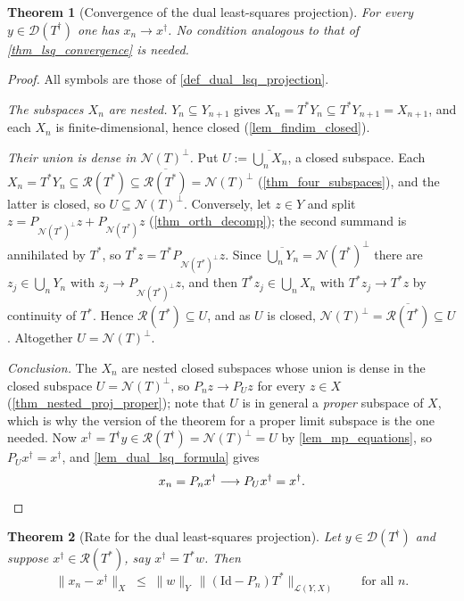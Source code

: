 \documentclass[a4paper]{report}
\theoremstyle{plain}
\newtheorem{theorem}{Theorem}[chapter]
\theoremstyle{definition}
\theoremstyle{remark}
\newcommand{\Ll}{\mathcal{L}}
\newcommand{\Ran}{\mathcal{R}}
\newcommand{\Ker}{\mathcal{N}}
\newcommand{\Dom}{\mathcal{D}}
\newcommand{\Id}{\mathrm{Id}}
\newcommand{\dg}{^{\dagger}}
\begin{document}
\begin{theorem}[Convergence of the dual least-squares projection]
  \label{thm_dual_lsq_convergence}
  For every $y \in \Dom(T\dg)$ one has $x_n \to x\dg$.  No condition analogous to that of
  \cref{thm_lsq_convergence} is needed.
\end{theorem}

\begin{proof}
  All symbols are those of \cref{def_dual_lsq_projection}.

  \emph{The subspaces $X_n$ are nested.}  $Y_n \subseteq Y_{n+1}$ gives
  $X_n = T^{*}Y_n \subseteq T^{*}Y_{n+1} = X_{n+1}$, and each $X_n$ is
  finite-dimensional, hence closed (\cref{lem_findim_closed}).

  \emph{Their union is dense in $\Ker(T)^{\perp}$.}  Put $U := \overline{\bigcup_nX_n}$, a
  closed subspace.  Each $X_n = T^{*}Y_n \subseteq \Ran(T^{*}) \subseteq
  \overline{\Ran(T^{*})} = \Ker(T)^{\perp}$ (\cref{thm_four_subspaces}), and the latter is
  closed, so $U \subseteq \Ker(T)^{\perp}$.  Conversely, let $z \in Y$ and split
  $z = P_{\Ker(T^{*})^{\perp}}z + P_{\Ker(T^{*})}z$ (\cref{thm_orth_decomp}); the second
  summand is annihilated by $T^{*}$, so $T^{*}z = T^{*}P_{\Ker(T^{*})^{\perp}}z$.  Since
  $\overline{\bigcup_nY_n} = \Ker(T^{*})^{\perp}$ there are
  $z_j \in \bigcup_nY_n$ with $z_j \to P_{\Ker(T^{*})^{\perp}}z$, and then
  $T^{*}z_j \in \bigcup_nX_n$ with $T^{*}z_j \to T^{*}z$ by continuity of $T^{*}$.  Hence
  $\Ran(T^{*}) \subseteq U$, and as $U$ is closed,
  $\Ker(T)^{\perp} = \overline{\Ran(T^{*})} \subseteq U$.  Altogether
  $U = \Ker(T)^{\perp}$.

  \emph{Conclusion.}  The $X_n$ are nested closed subspaces whose union is dense in the
  closed subspace $U = \Ker(T)^{\perp}$, so $P_nz \to P_Uz$ for every $z \in X$
  (\cref{thm_nested_proj_proper}); note that $U$ is in general a \emph{proper} subspace of
  $X$, which is why the version of the theorem for a proper limit subspace is the one
  needed.  Now $x\dg = T\dg y \in \Ran(T\dg) = \Ker(T)^{\perp} = U$ by
  \cref{lem_mp_equations}, so $P_Ux\dg = x\dg$, and \cref{lem_dual_lsq_formula} gives
  \[
    x_n = P_nx\dg \longrightarrow P_Ux\dg = x\dg . \qedhere
  \]
\end{proof}


\begin{theorem}[Rate for the dual least-squares projection]
  \label{thm_dual_lsq_rate}
  Let $y \in \Dom(T\dg)$ and suppose $x\dg \in \Ran(T^{*})$, say $x\dg = T^{*}w$.  Then
  \[
    \|x_n - x\dg\|_X \;\le\; \|w\|_Y\,\bigl\|(\Id - P_n)T^{*}\bigr\|_{\Ll(Y,X)}
    \qquad \text{for all } n .
  \]
\end{theorem}
\end{document}
